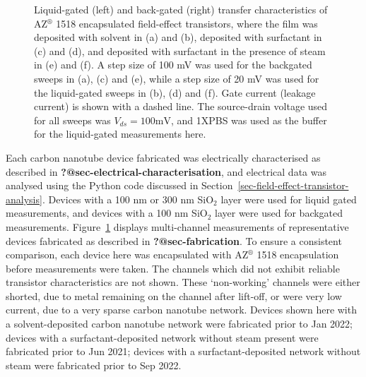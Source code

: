 \documentclass[
  a4paper,
]{scrbook}
\begin{document}
\begin{figure}
\begin{minipage}[t]{0.49\linewidth}
{{}

}

\subcaption{\label{fig-steam-tx-bg}}
\end{minipage}%

\caption{\label{fig-pristine-cnt-characteristics}Liquid-gated (left) and
back-gated (right) transfer characteristics of AZ\(^\circledR\) 1518
encapsulated field-effect transistors, where the film was deposited with
solvent in (a) and (b), deposited with surfactant in (c) and (d), and
deposited with surfactant in the presence of steam in (e) and (f). A
step size of 100 mV was used for the backgated sweeps in (a), (c) and
(e), while a step size of 20 mV was used for the liquid-gated sweeps in
(b), (d) and (f). Gate current (leakage current) is shown with a dashed
line. The source-drain voltage used for all sweeps was
\(V_{ds} = 100 \textrm{mV}\), and 1XPBS was used as the buffer for the
liquid-gated measurements here.}

\end{figure}

Each carbon nanotube device fabricated was electrically characterised as
described in \textbf{?@sec-electrical-characterisation}, and electrical
data was analysed using the Python code discussed in
Section~\ref{sec-field-effect-transistor-analysis}. Devices with a 100
nm or 300 nm SiO\(_2\) layer were used for liquid gated measurements,
and devices with a 100 nm SiO\(_2\) layer were used for backgated
measurements. Figure~\ref{fig-pristine-cnt-characteristics} displays
multi-channel measurements of representative devices fabricated as
described in \textbf{?@sec-fabrication}. To ensure a consistent
comparison, each device here was encapsulated with AZ\(^\circledR\) 1518
encapsulation before measurements were taken. The channels which did not
exhibit reliable transistor characteristics are not shown. These
`non-working' channels were either shorted, due to metal remaining on
the channel after lift-off, or were very low current, due to a very
sparse carbon nanotube network. Devices shown here with a
solvent-deposited carbon nanotube network were fabricated prior to Jan
2022; devices with a surfactant-deposited network without steam present
were fabricated prior to Jun 2021; devices with a surfactant-deposited
network without steam were fabricated prior to Sep 2022.
\end{document}
